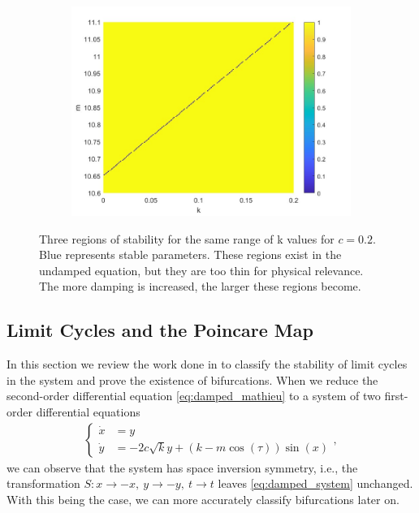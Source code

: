 \documentclass[12pt, letterpaper]{article}
\begin{document}
\begin{figure}[h]
\begin{subfigure}[b]{0.32\textwidth}
        \includegraphics[width=\linewidth]{DAmp_stab_1060_1110.jpg}
    \end{subfigure}
    \caption{Three regions of stability for the same range of k values for $c=0.2$. Blue represents stable parameters. These regions exist in the undamped equation, but they are too thin for physical relevance. The more damping is increased, the larger these regions become. }
    \label{fig:Damped_stability_diag}
\end{figure}

\subsection{Limit Cycles and the Poincare Map}
In this section we review the work done in \cite{kim1998hu} to classify the stability of limit cycles in the system and prove the existence of bifurcations. When we reduce the second-order differential equation \eqref{eq:damped_mathieu} to a system of two first-order differential equations 
\begin{align}
\begin{cases}
    \dot{x} &= y \\
    \dot{y} &= -2c\sqrt{k}y+(k-m\cos(\tau))\sin(x)
\end{cases}
\label{eq:damped_system},
\end{align}
we can observe that the system has space inversion symmetry, i.e., the transformation $S:x\rightarrow-x, ~y\rightarrow-y, ~t\rightarrow t$ leaves \eqref{eq:damped_system} unchanged. With this being the case, we can more accurately classify bifurcations later on.  
\end{document}
